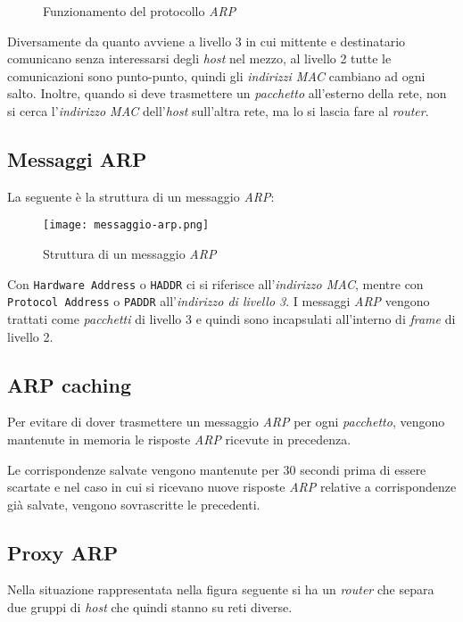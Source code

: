 \begin{figure}[h!]
    \centering
    \hfill
    \caption{Funzionamento del protocollo \emph{ARP}}
\end{figure}
\begin{note}
    Diversamente da quanto avviene a livello 3 in cui mittente e destinatario
    comunicano senza interessarsi degli \emph{host} nel mezzo, al livello 2
    tutte le comunicazioni sono punto-punto, quindi gli \emph{indirizzi MAC}
    cambiano ad ogni salto. Inoltre, quando si deve trasmettere un \emph{pacchetto}
    all'esterno della rete, non si cerca l'\emph{indirizzo MAC} dell'\emph{host}
    sull'altra rete, ma lo si lascia fare al \emph{router}.
\end{note}

\subsection{Messaggi ARP}
La seguente è la struttura di un messaggio \emph{ARP}:

\begin{figure}[h!]
    \centering
    \texttt{[image: messaggio-arp.png]}
    \caption{Struttura di un messaggio \emph{ARP}}
\end{figure}\noindent
Con \texttt{Hardware Address} o \texttt{HADDR} ci si riferisce all'\emph{indirizzo
MAC}, mentre con \texttt{Protocol Address} o \texttt{PADDR} all'\emph{indirizzo
di livello 3}.
I messaggi \emph{ARP} vengono trattati come \emph{pacchetti} di livello 3 e quindi
sono incapsulati all'interno di \emph{frame} di livello 2.

\subsection{ARP caching}
Per evitare di dover trasmettere un messaggio \emph{ARP} per ogni \emph{pacchetto},
vengono mantenute in memoria le risposte \emph{ARP} ricevute in precedenza.

Le corrispondenze salvate vengono mantenute per 30 secondi prima di essere scartate
e nel caso in cui si ricevano nuove risposte \emph{ARP} relative a corrispondenze
già salvate, vengono sovrascritte le precedenti.

\subsection{Proxy ARP}
Nella situazione rappresentata nella figura seguente si ha un \emph{router} che
separa due gruppi di \emph{host} che quindi stanno su reti diverse.

